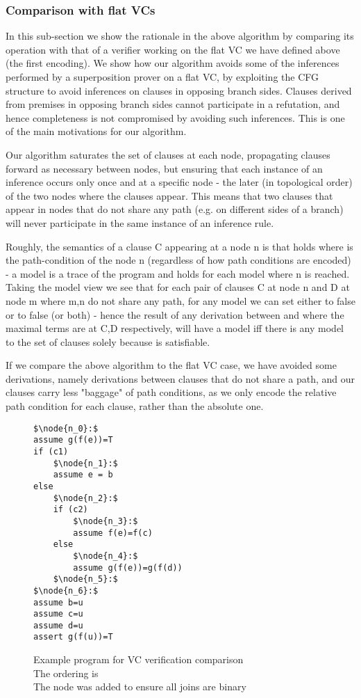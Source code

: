 \subsubsection*{Comparison with flat VCs}
In this sub-section we show the rationale in the above algorithm by comparing its operation with that of a verifier working on the flat VC we have defined above (the first encoding). We show how our algorithm avoids some of the inferences performed by a superposition prover on a flat VC, by exploiting the CFG structure to avoid inferences on clauses in opposing branch sides.
Clauses derived from premises in opposing branch sides cannot participate in a refutation, and hence completeness is not compromised by avoiding such inferences. This is one of the main motivations for our algorithm.

Our algorithm saturates the set of clauses at each node, propagating clauses forward as necessary between nodes, but ensuring that each instance of an inference occurs only once and at a specific node - the later (in topological order) of the two nodes where the clauses appear.
This means that two clauses that appear in nodes that do not share any path (e.g. on different sides of a branch) will never participate in the same instance of an inference rule.

Roughly, the semantics of a clause C appearing at a node n is that  holds where  is the path-condition of the node n (regardless of how path conditions are encoded) - a model is a trace of the program and  holds for each model where n is reached. 
Taking the model view we see that for each pair of clauses C at node n and D at node m where m,n do not share any path, 
for any model we can set either  to false or  to false (or both) - hence the result of any derivation between  and  where the maximal terms are at C,D respectively, will have a model iff there is any model to the set of clauses solely because  is satisfiable.

If we compare the above algorithm to the flat VC case, we have avoided some derivations, namely derivations between clauses that do not share a path, and our clauses carry less "baggage" of path conditions, as we only encode the relative path condition for each clause, rather than the absolute one.

\begin{figure}
\begin{lstlisting}
$\node{n_0}:$
assume g(f(e))=T
if (c1)
	$\node{n_1}:$
	assume e = b
else	
	$\node{n_2}:$
	if (c2)
		$\node{n_3}:$
		assume f(e)=f(c)
	else	
		$\node{n_4}:$
		assume g(f(e))=g(f(d))
	$\node{n_5}:$
$\node{n_6}:$
assume b=u
assume c=u
assume d=u
assert g(f(u))=T
\end{lstlisting}
\caption{Example program for VC verification comparison\\
The ordering is \\
The node  was added to ensure all joins are binary
}
\label{snippet4.1.2}
\end{figure}

